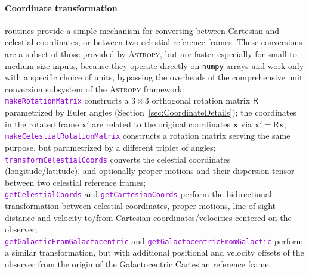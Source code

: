 \documentclass[12pt]{article}
\newcommand{\ttt}[1]{\textcolor{darkviolet}{\texttt{#1}}}
\begin{document}
\paragraph{Coordinate transformation} routines provide a simple mechanism for converting between Cartesian and celestial coordinates, or between two celestial reference frames. These conversions are a subset of those provided by \textsc{Astropy}, but are faster especially for small-to-medium size inputs, because they operate directly on \texttt{numpy} arrays and work only with a specific choice of units, bypassing the overheads of the comprehensive unit conversion subsystem of the \textsc{Astropy} framework:\\
\ttt{makeRotationMatrix} constructs a $3\times3$ orthogonal rotation matrix $\mathsf R$ parametrized by Euler angles (Section~\ref{sec:CoordinateDetails}); the coordinates in the rotated frame $\boldsymbol x'$ are related to the original coordinates $\boldsymbol x$ via $\boldsymbol x' = \mathsf R \boldsymbol x$;\\
\ttt{makeCelestialRotationMatrix} constructs a rotation matrix serving the same purpose, but parametrized by a different triplet of angles;\\
\ttt{transformCelestialCoords} converts the celestial coordinates (longitude/latitude), and optionally proper motions and their dispersion tensor between two celestial reference frames;\\
\ttt{getCelestialCoords} and \ttt{getCartesianCoords} perform the bidirectional transformation between celestial coordinates, proper motions, line-of-sight distance and velocity to/from Cartesian coordinates/velocities centered on the observer;\\
\ttt{getGalacticFromGalactocentric} and \ttt{getGalactocentricFromGalactic} perform a similar transformation, but with additional positional and velocity offsets of the observer from the origin of the Galactocentric Cartesian reference frame.
\end{document}
